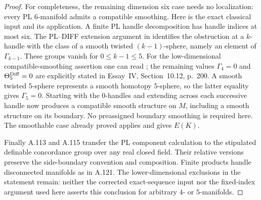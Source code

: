 \begin{proof}
For completeness, the remaining dimension six case needs no
localization: every PL $6$-manifold admits a compatible smoothing.
Here is the exact classical input and its application. A finite PL
handle decomposition has handle indices at most six. The
PL--DIFF extension argument in
\cite[Essay~IV, Appendix~B, p.~211]{KirbySiebenmann1977}
identifies the obstruction at a $k$-handle with the class of a
smooth twisted $(k-1)$-sphere, namely an element of
$\Gamma_{k-1}$. These groups vanish for $0\leq k-1\leq5$.
For the low-dimensional compatible-smoothing assertion one can
read \cite[Essay~I, p.~39]{KirbySiebenmann1977}; the remaining
values $\Gamma_4=0$ and $\Theta^{\rm Diff}_5=0$ are explicitly
stated in Essay~IV, Section~10.12, p.~200. A smooth twisted
$5$-sphere represents a smooth homotopy $5$-sphere, so the latter
equality gives $\Gamma_5=0$. Starting with the $0$-handles and
extending across each successive handle now produces a compatible
smooth structure on $M$, including a smooth structure on its
boundary. No preassigned boundary smoothing is required here.
The smoothable case already proved applies and gives $E(K)$.

Finally A.113 and A.115 transfer the PL component calculation to
the stipulated definable concordance group over any real closed
field. Their relative versions preserve the side-boundary
convention and composition. Finite products handle disconnected
manifolds as in A.121. The lower-dimensional exclusions in the
statement remain: neither the corrected exact-sequence input nor
the fixed-index argument used here asserts this conclusion for
arbitrary $4$- or $5$-manifolds.
\end{proof}
